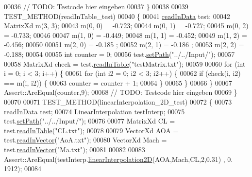 \begin{DoxyCode}
00036             \textcolor{comment}{// TODO: Testcode hier eingeben}
00037         \}
00038 
00039         TEST\_METHOD(readInTable\_test)
00040         \{
00041             \hyperlink{classread_in_data}{readInData} test;
00042             MatrixXd m(3, 3);
00043             m(0, 0) = -0.723;
00044             m(0, 1) = -0.727;
00045             m(0, 2) = -0.733;
00046 
00047             m(1, 0) = -0.449;
00048             m(1, 1) = -0.452;
00049             m(1, 2) = -0.456;
00050 
00051             m(2, 0) = -0.185 ;
00052             m(2, 1) = -0.186 ;
00053             m(2, 2) = -0.188;
00054 
00055             \textcolor{keywordtype}{int} counter = 0;
00056             test.\hyperlink{classread_in_data_ad67d566fd837f6d721db279144d484e0}{setPath}(\textcolor{stringliteral}{"../../Input/"});
00057 
00058             MatrixXd check = test.\hyperlink{classread_in_data_af616573832efc2c27f07f5f6877b1386}{readInTable}(\textcolor{stringliteral}{"testMatrix.txt"});
00059             
00060             \textcolor{keywordflow}{for} (\textcolor{keywordtype}{int} i = 0; i < 3; i++) \{
00061                 \textcolor{keywordflow}{for} (\textcolor{keywordtype}{int} i2 = 0; i2 < 3; i2++) \{
00062                     \textcolor{keywordflow}{if} (check(i, i2) == m(i, i2)) \{
00063                         counter = counter + 1;
00064                     \}
00065                 \}
00066             \}
00067             Assert::AreEqual(counter,9);
00068             \textcolor{comment}{// TODO: Testcode hier eingeben}
00069         \}
00070 
00071         TEST\_METHOD(linearInterpolation\_2D\_test)
00072         \{
00073             \hyperlink{classread_in_data}{readInData} test;
00074             \hyperlink{class_linear_interpolation}{LinearInterpolation} testInterp;
00075             test.\hyperlink{classread_in_data_ad67d566fd837f6d721db279144d484e0}{setPath}(\textcolor{stringliteral}{"../../Input/"});
00076 
00077             MatrixXd CL = test.\hyperlink{classread_in_data_af616573832efc2c27f07f5f6877b1386}{readInTable}(\textcolor{stringliteral}{"CL.txt"});
00078 
00079             VectorXd AOA = test.\hyperlink{classread_in_data_ab57aff38529234593d786ecace301cf7}{readInVector}(\textcolor{stringliteral}{"AoA.txt"});
00080             VectorXd Mach = test.\hyperlink{classread_in_data_ab57aff38529234593d786ecace301cf7}{readInVector}(\textcolor{stringliteral}{"Ma.txt"});
00081 
00082 
00083             Assert::AreEqual(testInterp.\hyperlink{class_linear_interpolation_a6b143368c20db0d2cda905a86391f83f}{linearInterpolation2D}(AOA,Mach,CL,2,0.31) , 0.
      1912);
00084             

\end{DoxyCode}
